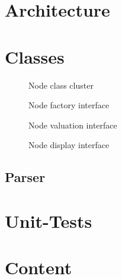 
\section{Architecture}

\section{Classes}






%
\begin{figure}[htbp]
\begin{center}
\caption{Node class cluster}
\label{fig:NyayaNodeCluster}
\end{center}
\end{figure}

\begin{figure}[htbp]
\begin{center}
\caption{Node factory interface}
\label{fig:NyayaNodeCreation}
\end{center}
\end{figure}

\begin{figure}[htbp]
\begin{center}
\caption{Node valuation interface}
\label{fig:NyayaNodeValuation}
\end{center}
\end{figure}

\begin{figure}[htbp]
\begin{center}
\caption{Node display interface}
\label{fig:NyayaNodeDisplay}
\end{center}
\end{figure}




\subsection{Parser}
\cite{Louden:1997:CCP:523017}

\section{Unit-Tests}

\section{Content}



